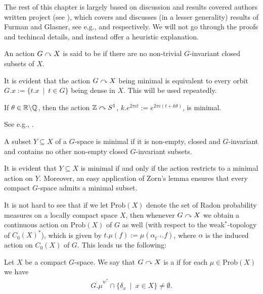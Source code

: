 The rest of this chapter is largely based on discussion and results covered authors written project (see \cite{bscp}), which covers and discusses (in a lesser generality) results of Furman and Glasner, see e.g., \cite{furman2003minimal} and \cite{glasner1976proximal} respectively. We will not go through the proofs and techincal details, and instead offer a heuristic explanation.
\begin{definition}
	An action $G \stackrel{}{\curvearrowright} X$ is said to be  if there are no non-trivial $G$-invariant closed subsets of $X$.
\end{definition}
\begin{remark}
	It is evident that the action $G \stackrel{}{\curvearrowright} X$ being minimal is equivalent to every orbit $G.x := \{t.x \ \mid \ t \in G\}$ being dense in $X$. This will be used repeatedly.
\end{remark}
\begin{example}
	If $\theta \in \mathbb{R} \backslash \mathbb{Q}$, then the action $\mathbb{Z} \stackrel{}{\curvearrowright} S^1$, $k.e^{2\pi i t}:= e^{2 \pi i (t+k\theta)}$, is minimal.	
\end{example}
See e.g., \mbox{\cite[Example 4.6]{bscp}}. 
\begin{definition}
	A subset $Y \subseteq X$ of a $G$-space is minimal if it is non-empty, closed and $G$-invariant and contains no other non-empty closed $G$-invariant subsets.
\end{definition}
\begin{remark}
	It is evident that $Y \subseteq X$ is minimal if and only if the action restricts to a minimal action on $Y$. Moreover, an easy application of Zorn's lemma ensures that every compact $G$-space admits a minimal subset.
\end{remark}
It is not hard to see that if we let $\mathrm{Prob}(X)$ denote the set of Radon probability measures on a locally compact space $X$, then whenever $G \stackrel{}{\curvearrowright} X$ we obtain a continuous action on $\mathrm{Prob}(X)$ of $G$ as well (with respect to the weak$^*$-topology of $C_0(X)^*$), which is given by $t.\mu(f) := \mu(\alpha_{t^{-1}}.f)$, where $\alpha$ is the induced action on $C_0(X)$ of $G$. This leads us the following:
\begin{definition}
	Let $X$ be a compact $G$-space. We say that $G \stackrel{}{\curvearrowright} X$ is a  if for each $\mu \in \mathrm{Prob}(X)$ we have
	\begin{align*}
		\overline{G.\mu}^{w^*} \cap \{\delta_x \ \mid \ x \in X\} \neq \emptyset.
	\end{align*}
\end{definition}
